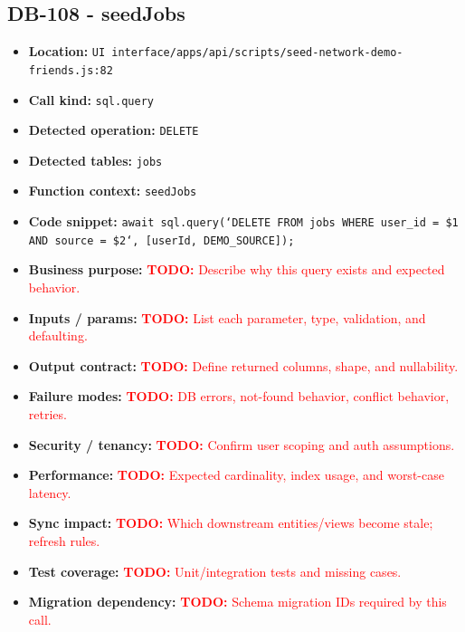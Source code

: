 \documentclass[11pt]{article}
\newcommand{\todoitem}[1]{\textcolor{red}{\textbf{TODO:} #1}}
\begin{document}
\subsection{DB-108 - seedJobs}
\begin{itemize}[leftmargin=1.5em]
\item \textbf{Location:} \texttt{UI interface/apps/api/scripts/seed-network-demo-friends.js:82}
\item \textbf{Call kind:} \texttt{sql.query}
\item \textbf{Detected operation:} \texttt{DELETE}
\item \textbf{Detected tables:} \texttt{jobs}
\item \textbf{Function context:} \texttt{seedJobs}
\item \textbf{Code snippet:} \texttt{await sql.query(`DELETE FROM jobs WHERE user\_id = \$1 AND source = \$2`, [userId, DEMO\_SOURCE]);}
\item \textbf{Business purpose:} \todoitem{Describe why this query exists and expected behavior.}
\item \textbf{Inputs / params:} \todoitem{List each parameter, type, validation, and defaulting.}
\item \textbf{Output contract:} \todoitem{Define returned columns, shape, and nullability.}
\item \textbf{Failure modes:} \todoitem{DB errors, not-found behavior, conflict behavior, retries.}
\item \textbf{Security / tenancy:} \todoitem{Confirm user scoping and auth assumptions.}
\item \textbf{Performance:} \todoitem{Expected cardinality, index usage, and worst-case latency.}
\item \textbf{Sync impact:} \todoitem{Which downstream entities/views become stale; refresh rules.}
\item \textbf{Test coverage:} \todoitem{Unit/integration tests and missing cases.}
\item \textbf{Migration dependency:} \todoitem{Schema migration IDs required by this call.}
\end{itemize}
\end{document}
